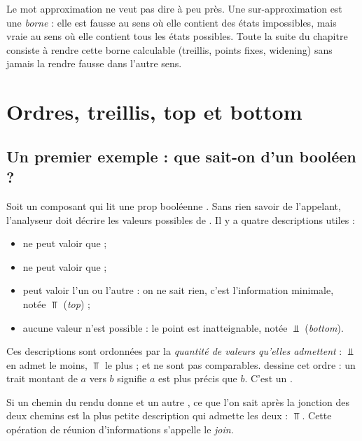 \begin{remarque}
  Le mot \og approximation\fg{} ne veut pas dire \og à peu près\fg{}. Une
  sur-approximation est une \emph{borne} : elle est fausse au sens où elle
  contient des états impossibles, mais vraie au sens où elle contient tous les
  états possibles. Toute la suite du chapitre consiste à rendre cette borne
  calculable (treillis, points fixes, widening) sans jamais la rendre fausse
  dans l'autre sens.
\end{remarque}

\section{Ordres, treillis, top et bottom}
\label{sec:interpretation-abstraite-treillis}

\subsection{Un premier exemple : que sait-on d'un booléen ?}

Soit un composant qui lit une prop booléenne . Sans rien savoir de
l'appelant, l'analyseur doit décrire les valeurs possibles de . Il
y a quatre descriptions utiles :
\begin{itemize}
  \item \og {} ne peut valoir que \fg{} ;
  \item \og {} ne peut valoir que \fg{} ;
  \item \og {} peut valoir l'un ou l'autre\fg{} : on ne sait rien, c'est
    l'information minimale, notée $\Top$ (\emph{top}) ;
  \item \og aucune valeur n'est possible\fg{} : le point est inatteignable,
    notée $\Bot$ (\emph{bottom}).
\end{itemize}
Ces descriptions sont ordonnées par la \emph{quantité de valeurs qu'elles
admettent} : $\Bot$ en admet le moins, $\Top$ le plus ;  et
 ne sont pas comparables. 
dessine cet ordre : un trait montant de $a$ vers $b$ signifie \og $a$ est plus
précis que $b$\fg{}. C'est un .

Si un chemin du rendu donne  et un autre ,
ce que l'on sait après la jonction des deux chemins est la plus petite
description qui admette les deux : $\Top$. Cette opération de \og réunion
d'informations\fg{} s'appelle le \emph{join}.

